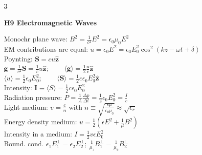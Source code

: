 \documentclass[a4paper,twoside]{article}
\newcommand{\secblock}[1]{%
\par\vspace{3pt}%
\noindent\colorbox{hdrcol}{\parbox[c][1.1em][c]{0.98\linewidth}{\color{white}\bfseries\small #1}}\par
\vspace{2pt}%
}
\begin{document}
\begin{multicols*}{3}
\secblock{H9 Electromagnetic Waves}
Monochr plane wave: \(B^2 = \frac{1}{c^2} E^2 = \epsilon_0 \mu_0 E^2\)\\
EM contributions are equal: \(u = \epsilon_0 E^2 = \epsilon_0 E_0^2 \cos^2(k z - \omega t + \delta)\)\\
Poynting: \(\bm S = c u \hat{\bm z}\)\\
\(\bm g = \frac{1}{c^2} \bm S = \frac{1}{c} u \hat{\bm z}\); \(\qquad \langle \bm g \rangle = \frac{1}{2} \frac{u}{c} \hat{\bm z}\)\\
\(\langle u \rangle = \frac{1}{2} \epsilon_0 E_0^2\); \(\qquad \langle \bm S \rangle = \frac{1}{2} c \epsilon_0 E_0^2 \hat{\bm z}\)\\
Intensity: \(\bm I \equiv \langle  S \rangle = \frac{1}{2} c \epsilon_0 E_0^2 \)\\
Radiation pressure: \(P = \frac{1}{A}\frac{\Delta p}{\Delta t} = \frac{1}{2}\epsilon_0 E_0^2 =\frac{I}{c}\)\\
Light medium: \(v = \frac{c}{n}\) with \(n \equiv \sqrt{\frac{\epsilon \mu}{\epsilon_0 \mu_0}} \approx \sqrt{\epsilon_r}\)\\
Energy density medium: \(u = \frac{1}{2} (\epsilon E^2 + \frac{1}{\mu} B^2)\)\\
Intensity in a medium: \(I = \frac{1}{2} v \epsilon E_0^2 \)\\
Bound. cond. \(\epsilon_1 E_1^{\perp} = \epsilon_2 E_2^{\perp}\); \(\frac{1}{\mu_1} B_1^{\perp} = \frac{1}{\mu_2} B_2^{\perp}\)


\end{multicols*}
\end{document}
